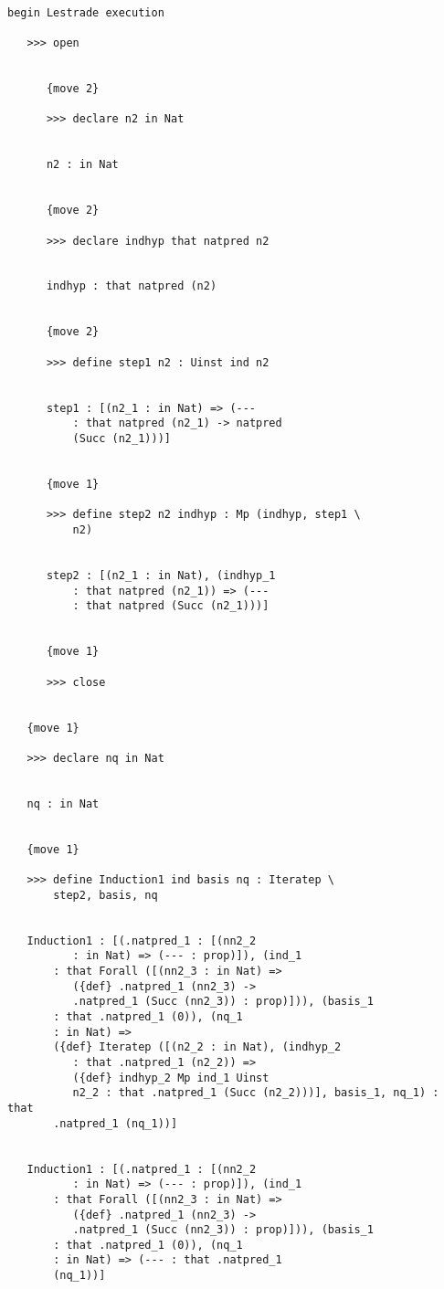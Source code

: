 \documentclass[12pt]{article}
\begin{document}
\begin{verbatim}

begin Lestrade execution

   >>> open


      {move 2}

      >>> declare n2 in Nat


      n2 : in Nat


      {move 2}

      >>> declare indhyp that natpred n2


      indhyp : that natpred (n2)


      {move 2}

      >>> define step1 n2 : Uinst ind n2


      step1 : [(n2_1 : in Nat) => (--- 
          : that natpred (n2_1) -> natpred 
          (Succ (n2_1)))]


      {move 1}

      >>> define step2 n2 indhyp : Mp (indhyp, step1 \
          n2)


      step2 : [(n2_1 : in Nat), (indhyp_1 
          : that natpred (n2_1)) => (--- 
          : that natpred (Succ (n2_1)))]


      {move 1}

      >>> close


   {move 1}

   >>> declare nq in Nat


   nq : in Nat


   {move 1}

   >>> define Induction1 ind basis nq : Iteratep \
       step2, basis, nq


   Induction1 : [(.natpred_1 : [(nn2_2 
          : in Nat) => (--- : prop)]), (ind_1 
       : that Forall ([(nn2_3 : in Nat) => 
          ({def} .natpred_1 (nn2_3) -> 
          .natpred_1 (Succ (nn2_3)) : prop)])), (basis_1 
       : that .natpred_1 (0)), (nq_1 
       : in Nat) => 
       ({def} Iteratep ([(n2_2 : in Nat), (indhyp_2 
          : that .natpred_1 (n2_2)) => 
          ({def} indhyp_2 Mp ind_1 Uinst 
          n2_2 : that .natpred_1 (Succ (n2_2)))], basis_1, nq_1) : that 
       .natpred_1 (nq_1))]


   Induction1 : [(.natpred_1 : [(nn2_2 
          : in Nat) => (--- : prop)]), (ind_1 
       : that Forall ([(nn2_3 : in Nat) => 
          ({def} .natpred_1 (nn2_3) -> 
          .natpred_1 (Succ (nn2_3)) : prop)])), (basis_1 
       : that .natpred_1 (0)), (nq_1 
       : in Nat) => (--- : that .natpred_1 
       (nq_1))]



\end{verbatim}
\end{document}
